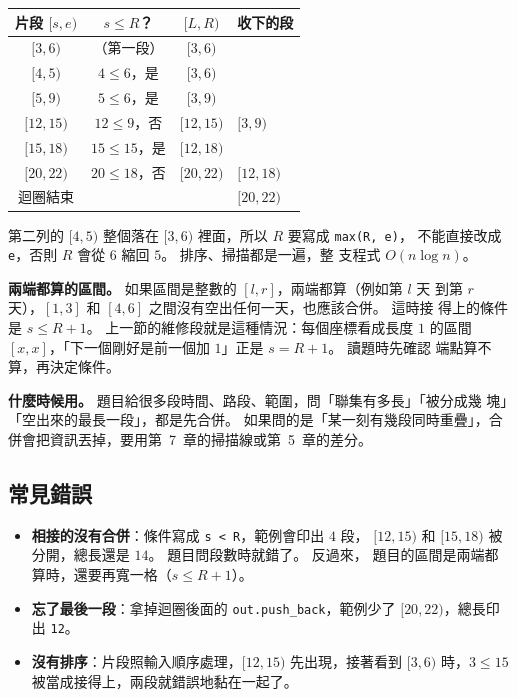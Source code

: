 \begin{center}
\begin{tabular}{cccl}
\toprule
片段 $[s, e)$ & $s \le R$？ & $[L, R)$ & 收下的段 \\
\midrule
$[3, 6)$ & （第一段） & $[3, 6)$ & \\
$[4, 5)$ & $4 \le 6$，是 & $[3, 6)$ & \\
$[5, 9)$ & $5 \le 6$，是 & $[3, 9)$ & \\
$[12, 15)$ & $12 \le 9$，否 & $[12, 15)$ & $[3, 9)$ \\
$[15, 18)$ & $15 \le 15$，是 & $[12, 18)$ & \\
$[20, 22)$ & $20 \le 18$，否 & $[20, 22)$ & $[12, 18)$ \\
迴圈結束 & & & $[20, 22)$ \\
\bottomrule
\end{tabular}
\end{center}

第二列的 $[4, 5)$ 整個落在 $[3, 6)$ 裡面，所以 $R$ 要寫成 \texttt{max(R, e)}，
不能直接改成 \texttt{e}，否則 $R$ 會從 $6$ 縮回 $5$。 排序、掃描都是一遍，整
支程式 $O(n \log n)$。

\textbf{兩端都算的區間。} 如果區間是整數的 $[l, r]$，兩端都算（例如第 $l$ 天
到第 $r$ 天），$[1, 3]$ 和 $[4, 6]$ 之間沒有空出任何一天，也應該合併。 這時接
得上的條件是 $s \le R + 1$。 上一節的維修段就是這種情況：每個座標看成長度 $1$
的區間 $[x, x]$，「下一個剛好是前一個加 $1$」正是 $s = R + 1$。 讀題時先確認
端點算不算，再決定條件。

\textbf{什麼時候用。} 題目給很多段時間、路段、範圍，問「聯集有多長」「被分成幾
塊」「空出來的最長一段」，都是先合併。 如果問的是「某一刻有幾段同時重疊」，合
併會把資訊丟掉，要用第~7~章的掃描線或第~5~章的差分。

\subsection{常見錯誤}

\begin{itemize}
\item \textbf{相接的沒有合併}：條件寫成 \texttt{s < R}，範例會印出 $4$ 段，
$[12, 15)$ 和 $[15, 18)$ 被分開，總長還是 $14$。 題目問段數時就錯了。 反過來，
題目的區間是兩端都算時，還要再寬一格（$s \le R + 1$）。
\item \textbf{忘了最後一段}：拿掉迴圈後面的 \texttt{out.push\_back}，範例少了
$[20, 22)$，總長印出 \texttt{12}。
\item \textbf{沒有排序}：片段照輸入順序處理，$[12, 15)$ 先出現，接著看到
$[3, 6)$ 時，$3 \le 15$ 被當成接得上，兩段就錯誤地黏在一起了。
\end{itemize}

